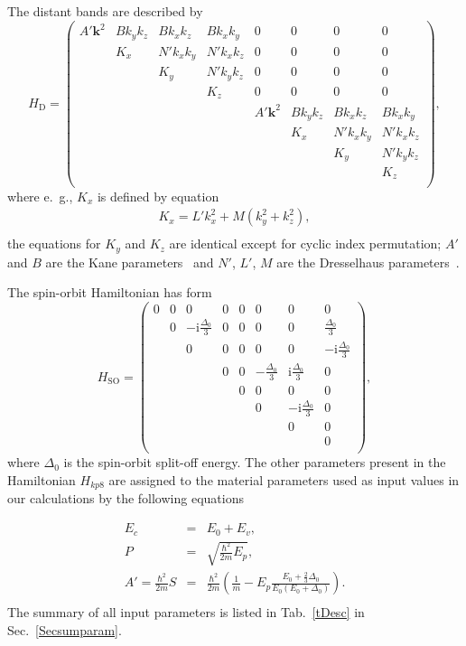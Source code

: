 The distant bands are described by
%
\begin{equation}
H_\mathrm{D}=
\begin{pmatrix}
A'\mathbf{k}^2& Bk_yk_z& Bk_xk_z& Bk_xk_y& 0& 0& 0& 0\\
& K_x& N'k_xk_y& N'k_xk_z& 0& 0& 0& 0\\
& & K_y& N'k_yk_z& 0& 0& 0& 0\\
& & & K_z& 0& 0& 0& 0\\
& & & & A'\mathbf{k}^2& Bk_yk_z& Bk_xk_z& Bk_xk_y\\
& & & & & K_x& N'k_xk_y& N'k_xk_z\\
& & & & & & K_y& N'k_yk_z\\
& & & & & & & K_z\\
\end{pmatrix},
\end{equation}
where e.~g., $K_x$ is defined by equation
\begin{eqnarray*}
	K_x=L'k_x^2+M(k_y^2+k_z^2),\nonumber\\
\end{eqnarray*}
the equations for $K_y$ and $K_z$ are identical except for cyclic index permutation; $A'$ and $B$ are the Kane parameters~\citep{Kane} and $N'$, $L'$, $M$ are the Dresselhaus parameters~\citep{Dress}.

The spin-orbit Hamiltonian has form
\begin{equation}
H_\mathrm{SO}=
\begin{pmatrix}
0& 0& 0& 0& 0& 0& 0& 0\\
& 0& -\mathrm{i}\frac{\Delta_0}{3}& 0& 0& 0& 0& \frac{\Delta_0}{3}\\
& & 0& 0& 0& 0& 0& -\mathrm{i}\frac{\Delta_0}{3}\\
& & & 0& 0& -\frac{\Delta_0}{3}& \mathrm{i}\frac{\Delta_0}{3}& 0\\
& & & & 0& 0& 0& 0\\
& & & & & 0& -\mathrm{i}\frac{\Delta_0}{3}& 0\\
& & & & & & 0& 0\\
& & & & & & & 0\\
\end{pmatrix},
\end{equation}
where $\Delta_0$ is the spin-orbit split-off energy. The other parameters present in the Hamiltonian $H_{kp8}$ are assigned to the material parameters used as input values in our calculations by the following equations

\begin{eqnarray}
E_c&=&E_0+E_v,\nonumber\\
P&=&\sqrt{\frac{\hbar^2}{2m}E_p},\nonumber\\
A'=\frac{\hbar^2}{2m}S&=&\frac{\hbar^2}{2m}\left(\frac{1}{m}-E_p\frac{E_0+\frac{2}{3}\Delta_0}{E_0(E_0+\Delta_0)}\right).\nonumber\\
\end{eqnarray}
{\noindent The summary of all input parameters is listed in Tab.~\ref{tDesc} in Sec.~\ref{Secsumparam}.}
 

